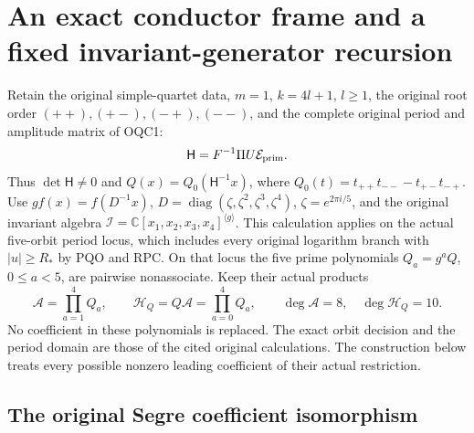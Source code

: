 \section{An exact conductor frame and a fixed invariant-generator recursion}
\label{sec:OCF}

Retain the original simple-quartet data, $m=1$, $k=4l+1$,
$l\geq1$, the original root order $(++),(+-),(-+),(--)$, and
the complete original period and amplitude matrix of OQC1:
\[
                  \mathsf H=F^{-1}\Pi U\mathcal E_{\rm prim}.
\]
Thus $\det\mathsf H\ne0$ and
$Q(x)=Q_0(\mathsf H^{-1}x)$, where
$Q_0(t)=t_{++}t_{--}-t_{+-}t_{-+}$.
Use $g f(x)=f(D^{-1}x)$,
$D=\operatorname{diag}(\zeta,\zeta^2,\zeta^3,\zeta^4)$,
$\zeta=e^{2\pi i/5}$, and the original invariant algebra
$\mathscr I=\mathbb C[x_1,x_2,x_3,x_4]^{\langle g\rangle}$.
This calculation applies on the actual five-orbit period locus,
which includes every original logarithm branch with $|u|\geq R_*$
by PQO and RPC. On that locus the five prime polynomials
$Q_a=g^aQ$, $0\leq a<5$, are pairwise nonassociate. Keep their
actual products
\[
 \mathcal A=\prod_{a=1}^4Q_a,\qquad
 \mathcal H_Q=Q\mathcal A=\prod_{a=0}^4Q_a,
 \qquad \deg\mathcal A=8,\quad\deg\mathcal H_Q=10.
 \tag{OCF1}
\]
No coefficient in these polynomials is replaced. The exact orbit
decision and the period domain are those of the cited original
calculations. The construction below treats every possible nonzero
leading coefficient of their actual restriction.

\subsection{The original Segre coefficient isomorphism}


